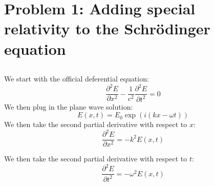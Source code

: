 \documentclass{article}
\begin{document}
\section{Problem 1: Adding special relativity to the Schr\"{o}dinger equation}
\subsection{}


We start with the official deferential equation:
\begin{equation}
    \frac{\partial^2 E}{\partial x^2} - \frac{1}{c^2} \frac{\partial^2 E}{\partial t^2} = 0
\end{equation}
We then plug in the plane wave solution:
\begin{equation}
    E(x, t) = E_0 \exp(i(kx - \omega t))
\end{equation}
We then take the second partial derivative with respect to $x$:
\begin{equation}
    \frac{\partial^2 E}{\partial x^2} = -k^2 E(x, t)
\end{equation}

We then take the second partial derivative with respect to $t$:
\begin{equation}
    \frac{\partial^2 E}{\partial t^2} = -\omega^2 E(x, t)
\end{equation}
\end{document}
